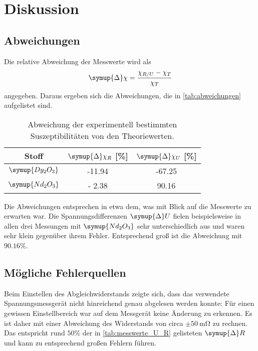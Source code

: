\section{Diskussion} \label{sec:diskussion}

\subsection{Abweichungen}

Die relative Abweichung der Messwerte wird als
\begin{equation*}
  \symup{\Delta}\chi = \frac{\chi_{R/U} - \chi_T}{\chi_T}
\end{equation*}
angegeben.
Daraus ergeben sich die Abweichungen,
die in \autoref{tab:abweichungen} aufgelistet sind.

\begin{table}
  \centering
  \caption{Abweichung der experimentell bestimmten Suszeptibilitäten von den Theoriewerten.}
  \label{tab:abweichungen}
  \begin{tabular}{c S S}
  \toprule
  Stoff &
  {$\symup{\Delta} \chi_R$ [\%]} &
  {$\symup{\Delta} \chi_U$ [\%]} \\
  \midrule
  $\symup{Dy_2O_3}$ & -11.94 & -67.25 \\
  $\symup{Nd_2O_3}$ & - 2.38 &  90.16 \\
  \bottomrule
  \end{tabular}
\end{table}

Die Abweichungen entsprechen in etwa dem,
was mit Blick auf die Messwerte zu erwarten war.
Die Spannungsdifferenzen $\symup{\Delta}U$ fielen beispielsweise in allen drei Messungen mit $\symup{Nd_2O_3}$ sehr unterschiedlich aus
und waren sehr klein gegenüber ihrem Fehler.
Entsprechend groß ist die Abweichung mit $\num{90.16}\%$.


\subsection{Mögliche Fehlerquellen}

Beim Einstellen des Abgleichwiderstands zeigte sich,
dass das verwendete Spannungsmessgerät nicht hinreichend genau abgelesen werden konnte:
Für einen gewissen Einstellbereich war auf dem Messgerät keine Änderung zu erkennen.
Es ist daher mit einer Abweichung des Widerstands von circa $\pm\SI{50}{\milli\ohm}$ zu rechnen.
Das entspricht rund $\num{50}\%$ der in \autoref{tab:messwerte_U_R} gelisteten $\symup{\Delta}R$ und kann zu entsprechend großen Fehlern führen.


